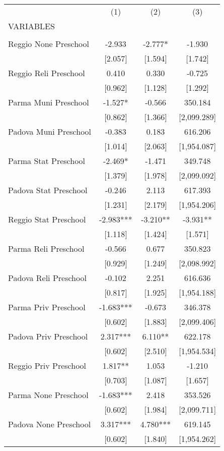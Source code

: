 \begin{tabular}{lccc} \hline
 & (1) & (2) & (3) \\
VARIABLES &  &  &  \\ \hline
 &  &  &  \\
Reggio None Preschool & -2.933 & -2.777* & -1.930 \\
 & [2.057] & [1.594] & [1.742] \\
Reggio Reli Preschool & 0.410 & 0.330 & -0.725 \\
 & [0.962] & [1.128] & [1.292] \\
Parma Muni Preschool & -1.527* & -0.566 & 350.184 \\
 & [0.862] & [1.366] & [2,099.289] \\
Padova Muni Preschool & -0.383 & 0.183 & 616.206 \\
 & [1.014] & [2.063] & [1,954.087] \\
Parma Stat Preschool & -2.469* & -1.471 & 349.748 \\
 & [1.379] & [1.978] & [2,099.092] \\
Padova Stat Preschool & -0.246 & 2.113 & 617.393 \\
 & [1.231] & [2.179] & [1,954.206] \\
Reggio Stat Preschool & -2.983*** & -3.210** & -3.931** \\
 & [1.118] & [1.424] & [1.571] \\
Parma Reli Preschool & -0.566 & 0.677 & 350.823 \\
 & [0.929] & [1.249] & [2,098.992] \\
Padova Reli Preschool & -0.102 & 2.251 & 616.636 \\
 & [0.817] & [1.925] & [1,954.188] \\
Parma Priv Preschool & -1.683*** & -0.673 & 346.378 \\
 & [0.602] & [1.883] & [2,099.406] \\
Padova Priv Preschool & 2.317*** & 6.110** & 622.178 \\
 & [0.602] & [2.510] & [1,954.534] \\
Reggio Priv Preschool & 1.817** & 1.053 & -1.210 \\
 & [0.703] & [1.087] & [1.657] \\
Parma None Preschool & -1.683*** & 2.418 & 353.526 \\
 & [0.602] & [1.984] & [2,099.711] \\
Padova None Preschool & 3.317*** & 4.780*** & 619.145 \\
 & [0.602] & [1.840] & [1,954.262] \\

\end{tabular}
